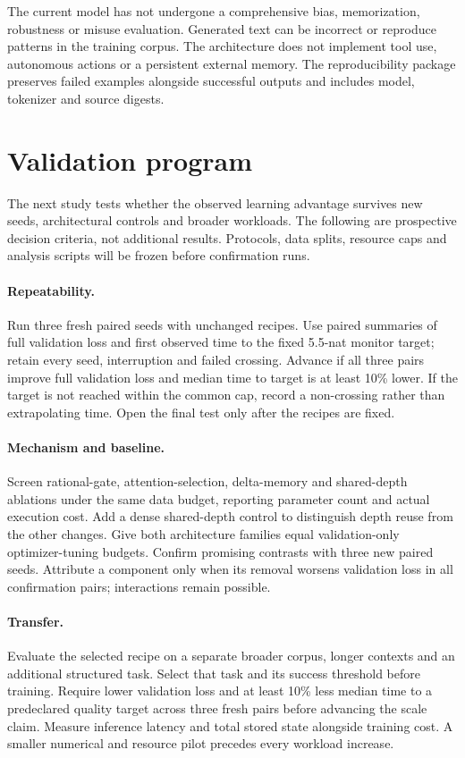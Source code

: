 \documentclass[11pt]{article}
\begin{document}
The current model has not undergone a comprehensive bias, memorization,
robustness or misuse evaluation. Generated text can be incorrect or reproduce
patterns in the training corpus. The architecture does not implement tool use,
autonomous actions or a persistent external memory. The reproducibility
package preserves failed examples alongside successful outputs and includes
model, tokenizer and source digests.

\section{Validation program}
The next study tests whether the observed learning advantage survives new
seeds, architectural controls and broader workloads. The following are
prospective decision criteria, not additional results. Protocols, data splits,
resource caps and analysis scripts will be frozen before confirmation runs.

\paragraph{Repeatability.}
Run three fresh paired seeds with unchanged recipes. Use paired summaries of
full validation loss and first observed time to the fixed 5.5-nat monitor target;
retain every seed, interruption and failed crossing. Advance if all three pairs
improve full validation loss and median time to target is at least 10\% lower.
If the target is not reached within the common cap, record a non-crossing rather
than extrapolating time. Open the final test only after the recipes are fixed.

\paragraph{Mechanism and baseline.}
Screen rational-gate, attention-selection, delta-memory and shared-depth
ablations under the same data budget, reporting parameter count and actual
execution cost. Add a dense shared-depth control to distinguish depth reuse
from the other changes. Give both architecture families equal validation-only
optimizer-tuning budgets. Confirm promising contrasts with three new paired
seeds. Attribute a component only when its removal worsens validation loss in
all confirmation pairs; interactions remain possible.

\paragraph{Transfer.}
Evaluate the selected recipe on a separate broader corpus, longer contexts and
an additional structured task. Select that task and its success threshold before
training. Require lower validation loss and at least 10\% less median time to a
predeclared quality target across three fresh pairs before advancing the scale
claim. Measure inference latency and total stored state alongside training cost.
A smaller numerical and resource pilot precedes every workload increase.
\end{document}
